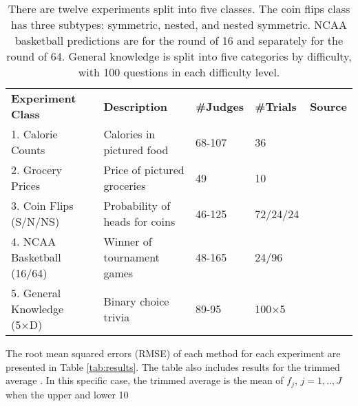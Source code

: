 \begin{table}[h]
\centering
\small
\begin{tabular}{lllll}
\rowcolor[HTML]{4472C4} 
{\color[HTML]{FFFFFF} \textbf{Experiment Class}} & {\color[HTML]{FFFFFF} \textbf{Description}} & {\color[HTML]{FFFFFF} \textbf{\#Judges}} & {\color[HTML]{FFFFFF} \textbf{\#Trials}} & {\color[HTML]{FFFFFF} \textbf{Source}} \\
1. Calorie Counts                                & Calories in pictured food                   & 68-107                                     & 36                                        & \citealp{kw}                                     \\
2. Grocery Prices                                & Price of pictured groceries                 & 49                                         & 10                                        & \citealp{mp}                                     \\
3. Coin Flips (S/N/NS)                           & Probability of heads for coins              & 46-125                                     & 72/24/24                                  & \citealp{mp}                               \\
4. NCAA Basketball (16/64)                       & Winner of tournament games                  & 48-165                                     & 24/96                                     & \citealp{mart}                                  \\
5. General Knowledge (5×D)                       & Binary choice trivia                        & 89-95                                      & 100×5                                     & \citealp{mart}                              
\end{tabular}
\normalsize
\caption{There are twelve experiments split into five classes. The coin flips class has three subtypes: symmetric, nested, and nested symmetric. NCAA basketball predictions are for the round of 16 and separately for the round of 64. General knowledge is split into five categories by difficulty, with 100 questions in each difficulty level.  }
\label{tab:data_description}
\end{table} 

The root mean squared errors (RMSE) of each method for each experiment are presented in Table \ref{tab:results}. The table also includes results for the trimmed average \citep{hillier_combining_2001, stock_combination_2004, jose_simple_2008}. In this specific case, the trimmed average is the mean of $f_j$, $j=1,..,J$ when the upper and lower 10\





